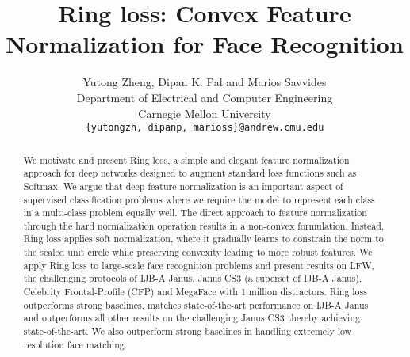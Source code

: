 \documentclass[10pt,twocolumn,letterpaper]{article}
\begin{document}
\title{Ring loss: Convex Feature Normalization for Face Recognition}



\author{Yutong Zheng, Dipan K. Pal and Marios Savvides \\
  Department of Electrical and Computer Engineering\\
  Carnegie Mellon University\\
{\tt\small \{yutongzh, dipanp, marioss\}@andrew.cmu.edu}
}

\maketitle



\begin{abstract}
We motivate and present Ring loss, a simple and elegant feature normalization approach for deep networks designed to augment standard loss functions such as Softmax. We argue that deep feature normalization is an important aspect of supervised classification problems where we require the model to represent each class in a multi-class problem equally well. The direct approach to feature normalization through the hard normalization operation results in a non-convex formulation. Instead, Ring loss applies soft normalization, where it gradually learns to constrain the norm to the scaled unit circle while preserving convexity leading to more robust features. We apply Ring loss to large-scale face recognition problems and present results on LFW, the challenging protocols of IJB-A Janus, Janus CS3 (a superset of IJB-A Janus), Celebrity Frontal-Profile (CFP) and MegaFace with 1 million distractors. Ring loss outperforms strong baselines, matches state-of-the-art performance on IJB-A Janus and outperforms all other results on the challenging Janus CS3 thereby achieving state-of-the-art. We also outperform strong baselines in handling extremely low resolution face matching.
\end{abstract}
\end{document}
